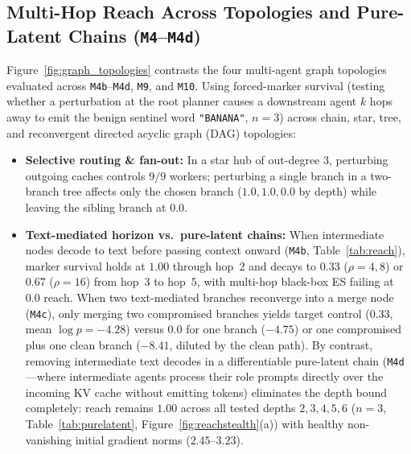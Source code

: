 \documentclass{article}
\begin{document}
\subsection{Multi-Hop Reach Across Topologies and Pure-Latent Chains (\texttt{M4}--\texttt{M4d})}
\label{sec:results-reach}
Figure~\ref{fig:graph_topologies} contrasts the four multi-agent graph topologies
evaluated across \texttt{M4b}--\texttt{M4d}, \texttt{M9}, and \texttt{M10}.
Using forced-marker survival (testing whether a perturbation at the root
planner causes a downstream agent $k$ hops away to emit the benign sentinel
word \texttt{"BANANA"}, $n=3$) across chain, star, tree, and reconvergent
directed acyclic graph (DAG) topologies:
\begin{itemize}
  \item \textbf{Selective routing \& fan-out:} In a star hub of out-degree $3$,
  perturbing outgoing caches controls $9/9$ workers; perturbing a single branch
  in a two-branch tree affects only the chosen branch ($1.0, 1.0, 0.0$ by depth)
  while leaving the sibling branch at $0.0$.
  \item \textbf{Text-mediated horizon vs.\ pure-latent chains:} When intermediate
  nodes decode to text before passing context onward (\texttt{M4b}, Table~\ref{tab:reach}),
  marker survival holds at $1.00$ through hop~$2$ and decays to $0.33$ ($\rho=4,8$) or $0.67$
  ($\rho=16$) from hop~$3$ to hop~$5$, with multi-hop black-box ES failing at
  $0.0$ reach. When two text-mediated branches reconverge into a merge node
  (\texttt{M4c}), only merging two compromised branches yields target control
  ($0.33$, mean $\log p=-4.28$) versus $0.0$ for one branch ($-4.75$) or one
  compromised plus one clean branch ($-8.41$, diluted by the clean path). By
  contrast, removing intermediate text decodes in a differentiable pure-latent
  chain (\texttt{M4d}---where intermediate agents process their role prompts
  directly over the incoming KV cache without emitting tokens) eliminates the
  depth bound completely: reach remains $1.00$ across all tested depths
  $2,3,4,5,6$ ($n=3$, Table~\ref{tab:purelatent},
  Figure~\ref{fig:reachstealth}(a)) with healthy non-vanishing initial gradient
  norms ($2.45$--$3.23$).
\end{itemize}
\end{document}
